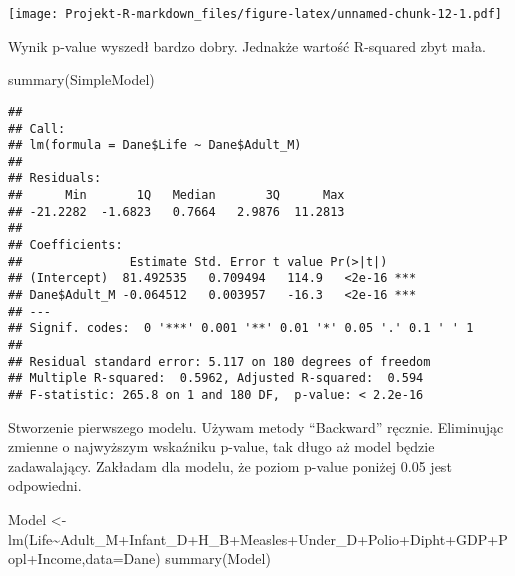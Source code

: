 \documentclass[
]{article}
\newenvironment{Shaded}{\begin{snugshade}}{\end{snugshade}}
\newcommand{\AttributeTok}[1]{\textcolor[rgb]{0.77,0.63,0.00}{#1}}
\newcommand{\FunctionTok}[1]{\textcolor[rgb]{0.00,0.00,0.00}{#1}}
\newcommand{\NormalTok}[1]{#1}
\newcommand{\OtherTok}[1]{\textcolor[rgb]{0.56,0.35,0.01}{#1}}
\newcommand{\SpecialCharTok}[1]{\textcolor[rgb]{0.00,0.00,0.00}{#1}}
\begin{document}
\texttt{[image: Projekt-R-markdown\_files/figure-latex/unnamed-chunk-12-1.pdf]}

Wynik p-value wyszedł bardzo dobry. Jednakże wartość R-squared zbyt
mała.

\begin{Shaded}
\begin{Highlighting}[]
\FunctionTok{summary}\NormalTok{(SimpleModel)}
\end{Highlighting}
\end{Shaded}

\begin{verbatim}
## 
## Call:
## lm(formula = Dane$Life ~ Dane$Adult_M)
## 
## Residuals:
##      Min       1Q   Median       3Q      Max 
## -21.2282  -1.6823   0.7664   2.9876  11.2813 
## 
## Coefficients:
##               Estimate Std. Error t value Pr(>|t|)    
## (Intercept)  81.492535   0.709494   114.9   <2e-16 ***
## Dane$Adult_M -0.064512   0.003957   -16.3   <2e-16 ***
## ---
## Signif. codes:  0 '***' 0.001 '**' 0.01 '*' 0.05 '.' 0.1 ' ' 1
## 
## Residual standard error: 5.117 on 180 degrees of freedom
## Multiple R-squared:  0.5962, Adjusted R-squared:  0.594 
## F-statistic: 265.8 on 1 and 180 DF,  p-value: < 2.2e-16
\end{verbatim}

Stworzenie pierwszego modelu. Używam metody ``Backward'' ręcznie.
Eliminując zmienne o najwyższym wskaźniku p-value, tak długo aż model
będzie zadawalający. Zakładam dla modelu, że poziom p-value poniżej 0.05
jest odpowiedni.

\begin{Shaded}
\begin{Highlighting}[]
\NormalTok{Model }\OtherTok{\textless{}{-}} \FunctionTok{lm}\NormalTok{(Life}\SpecialCharTok{\textasciitilde{}}\NormalTok{Adult\_M}\SpecialCharTok{+}\NormalTok{Infant\_D}\SpecialCharTok{+}\NormalTok{H\_B}\SpecialCharTok{+}\NormalTok{Measles}\SpecialCharTok{+}\NormalTok{Under\_D}\SpecialCharTok{+}\NormalTok{Polio}\SpecialCharTok{+}\NormalTok{Dipht}\SpecialCharTok{+}\NormalTok{GDP}\SpecialCharTok{+}\NormalTok{Popl}\SpecialCharTok{+}\NormalTok{Income,}\AttributeTok{data=}\NormalTok{Dane)}
\FunctionTok{summary}\NormalTok{(Model)}
\end{Highlighting}
\end{Shaded}
\end{document}
